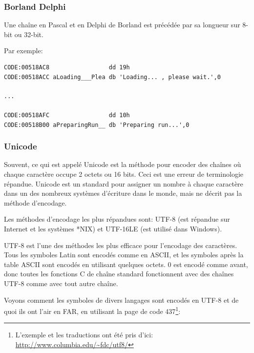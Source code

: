 
\subsubsection{Borland Delphi}

Une chaîne en Pascal et en Delphi de Borland est précédée par sa longueur sur 8-bit
ou 32-bit.

Par exemple:

\begin{lstlisting}[caption=Delphi,style=customasmx86]
CODE:00518AC8                 dd 19h
CODE:00518ACC aLoading___Plea db 'Loading... , please wait.',0

...

CODE:00518AFC                 dd 10h
CODE:00518B00 aPreparingRun__ db 'Preparing run...',0
\end{lstlisting}

\subsubsection{Unicode}


Souvent, ce qui est appelé Unicode est la méthode pour encoder des chaînes où chaque
caractère occupe 2 octets ou 16 bits.
Ceci est une erreur de terminologie répandue.
Unicode est un standard pour assigner un nombre à chaque caractère dans un des nombreux
systèmes d'écriture dans le monde, mais ne décrit pas la méthode d'encodage.

Les méthodes d'encodage les plus répandues sont: UTF-8 (est répandue sur Internet
et les systèmes *NIX) et UTF-16LE (est utilisé dans Windows).


UTF-8 est l'une des méthodes les plus efficace pour l'encodage des caractères.
Tous les symboles Latin sont encodés comme en ASCII, et les symboles après la table
ASCII sont encodés en utilisant quelques octets.
0 est encodé comme avant, donc toutes les fonctions C de chaîne standard fonctionnent
avec des chaînes UTF-8 comme avec tout autre chaîne.

Voyons comment les symboles de divers langages sont encodés en UTF-8 et de quoi ils
ont l'air en FAR, en utilisant la page de code 437\footnote{L'exemple et les traductions ont été pris d'ici:
\url{http://www.columbia.edu/~fdc/utf8/}}:

